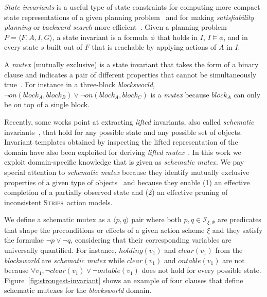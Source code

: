 \documentclass{article}
\newcommand{\tup}[1]{{\langle #1 \rangle}}
\newcommand{\strips}{\textsc{Strips}}
\begin{document}
{\em State invariants} is a useful type of state constraints for computing more compact state representations of a given planning problem~\cite{helmert2009concise} and for making {\em satisfiability planning} or {\em backward search} more efficient~\cite{rintanen2014madagascar,alcazar2015reminder}. Given a planning problem $P=\tup{F,A,I,G}$, a state invariant is a formula $\phi$ that holds in $I$, $I\models \phi$, and in every state $s$ built out of $F$ that is reachable by applying actions of $A$ in $I$.

A {\em mutex} (mutually exclusive) is a state invariant that takes the form of a binary clause and indicates a pair of different properties that cannot be simultaneously true~\cite{kautz:mutex:IJCAI1999}. For instance in a three-block {\em blocksworld}, $\neg on(block_A,block_B)\vee \neg on(block_A,block_C)$ is a {\em mutex} because $block_A$ can only be on top of a single block.

Recently, some works point at extracting \emph{lifted} invariants, also called {\em schematic} invariants~\cite{rintanen:schematicInvariants:AAAI2017}, that hold for any possible state and any possible set of objects. Invariant
templates obtained by inspecting the lifted representation of the domain have also been exploited for deriving \emph{lifted mutex}~\cite{BernardiniFS18}. In this work we exploit domain-specific knowledge that is given as {\em schematic mutex}. We pay special attention to {\em schematic mutex} because they identify mutually exclusive properties of a given type of objects~\cite{fox:TIM:JAIR1998} and because they enable (1) an effective completion of a partially observed state and (2) an effective pruning of inconsistent \strips\ action models.


We define a schematic mutex as a $\tup{p,q}$ pair where both $p,q\in{\mathcal I}_{\xi,\Psi}$ are predicates that shape the preconditions or effects of a given action scheme $\xi$ and they satisfy the formulae $\neg p\vee \neg q$, considering that their corresponding variables are universally quantified. For instance, $holding(v_1)$ and $clear(v_1)$ from the {\em blocksworld} are {\em schematic mutex} while $clear(v_1)$ and $ontable(v_1)$ are not because $\forall v_1, \neg clear(v_1)\vee\neg ontable(v_1)$ does not hold for every possible state. Figure~\ref{fig:strongest-invariant} shows an example of four clauses that define schematic mutexes for the {\em blocksworld} domain.
\end{document}
